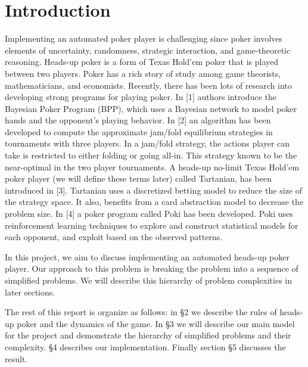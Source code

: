 \section{Introduction}\label{intro}
Implementing an automated poker player is challenging since poker involves
elements of uncertainty, randomness, strategic interaction, and game-theoretic
reasoning. Heads-up poker is a form of Texas Hold'em poker that is played 
between two players. Poker 
has a rich story of study among game theorists, mathematicians, 
and economists. Recently, there has been lots  of research into 
developing strong programs for playing poker. In [1] authors introduce
the Bayesian Poker Program (BPP), which uses a Bayesian network to model 
poker hands and the opponent's playing behavior. In [2] an algorithm has been developed
to compute the approximate jam/fold equilibrium strategies in tournaments 
with three players. In a jam/fold strategy, the actions player can take is restricted to 
either folding or going all-in. This strategy known to be 
the near-optimal in the two player tournaments. A heads-up no-limit Texas 
Hold'em poker player (we will define these terms later) called Tartanian, 
has been introduced in [3]. Tartanian
uses a discretized betting model to reduce the size of the strategy space.
It also, benefits from a card abstraction model to decrease the problem size.
In [4] a poker program called Poki has been developed. Poki uses reinforcement 
learning techniques to explore and construct statistical models for each opponent,
and exploit based on the observed patterns. 

In this project, we aim to discuss implementing an 
automated heads-up poker player. Our approach to this problem is breaking
the problem into a sequence of simplified problems. We will describe this hierarchy
of problem complexities in later sections.

The rest of this report is organize as follows: in \S 2 we describe the
rules of heads-up poker and the dynamics of the game. In \S 3 we will
describe our main model for the project and 
demonstrate the hierarchy of simplified problems and their complexity.
\S 4 describes our implementation.
Finally section \S 5 discusses the result.